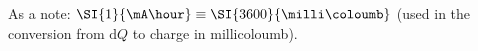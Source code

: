 As a note: $\SI{1}{\mA\hour} \equiv \SI{3600}{\milli\coloumb}$ (used in the conversion from $\text{d}Q$ to charge in millicoloumb).
